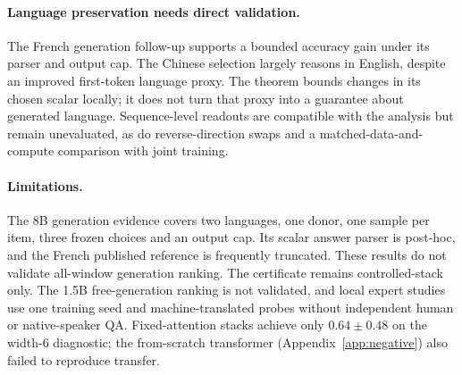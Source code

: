 \documentclass{article}
\theoremstyle{plain}
\theoremstyle{definition}
\theoremstyle{remark}
\begin{document}
\paragraph{Language preservation needs direct validation.}
The French generation follow-up supports a bounded accuracy gain under its
parser and output cap. The Chinese selection largely reasons in English,
despite an improved first-token language proxy. The theorem bounds changes
in its chosen scalar locally; it does not turn that proxy into a guarantee
about generated language. Sequence-level readouts are compatible with the
analysis but remain unevaluated, as do reverse-direction swaps and a
matched-data-and-compute comparison with joint training.

\paragraph{Limitations.}
The 8B generation evidence covers two languages, one donor, one sample per
item, three frozen choices and an output cap. Its scalar answer parser is
post-hoc, and the French published reference is frequently truncated. These
results do not validate all-window generation ranking. The certificate remains
controlled-stack only. The 1.5B free-generation ranking is not validated, and
local expert studies use one training seed and machine-translated probes
without independent human or native-speaker QA. Fixed-attention stacks
achieve only $0.64\pm0.48$ on the width-6 diagnostic; the from-scratch
transformer (Appendix~\ref{app:negative}) also failed to reproduce transfer.
\end{document}
